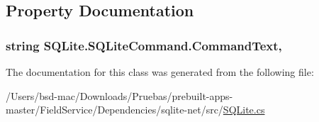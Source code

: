 \subsection{Property Documentation}
\hypertarget{class_s_q_lite_1_1_s_q_lite_command_aa0d35069590226d88b5c0e9c484160db}{
\subsubsection[{Command\+Text}]{\setlength{\rightskip}{0pt plus 5cm}string S\+Q\+Lite.\+S\+Q\+Lite\+Command.\+Command\+Text\hspace{0.3cm}{\ttfamily [get]}, {\ttfamily [set]}}}\label{class_s_q_lite_1_1_s_q_lite_command_aa0d35069590226d88b5c0e9c484160db}


The documentation for this class was generated from the following file\+:\begin{DoxyCompactItemize}
\item 
/\+Users/bsd-\/mac/\+Downloads/\+Pruebas/prebuilt-\/apps-\/master/\+Field\+Service/\+Dependencies/sqlite-\/net/src/\hyperlink{_s_q_lite_8cs}{S\+Q\+Lite.\+cs}\end{DoxyCompactItemize}
